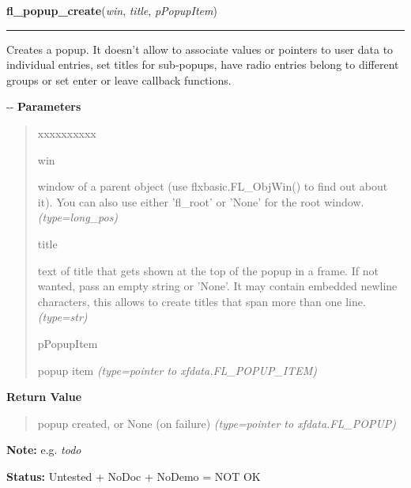     \label{xformslib:flpopup:fl_popup_create}

    \vspace{0.5ex}

\hspace{.8\funcindent}\begin{boxedminipage}{\funcwidth}

    \raggedright \textbf{fl\_popup\_create}(\textit{win}, \textit{title}, \textit{pPopupItem})

    \vspace{-1.5ex}

    \rule{\textwidth}{0.5\fboxrule}
\setlength{\parskip}{2ex}

Creates a popup. It doesn't allow to associate values or pointers to
user data to individual entries, set titles for sub-popups, have radio
entries belong to different groups or set enter or leave callback
functions.

-{}-
\setlength{\parskip}{1ex}
      \textbf{Parameters}
      \vspace{-1ex}

      \begin{quote}
        \begin{Ventry}{xxxxxxxxxx}

          \item[win]


window of a parent object (use flxbasic.FL\_ObjWin() to find out about
it). You can also use either 'fl\_root' or 'None' for the root window.
            {\it (type=long\_pos)}

          \item[title]


text of title that gets shown at the top of the popup in a frame. If
not wanted, pass an empty string or 'None'. It may contain embedded
newline characters, this allows to create titles that span more than
one line.
            {\it (type=str)}

          \item[pPopupItem]


popup item
            {\it (type=pointer to xfdata.FL\_POPUP\_ITEM)}

        \end{Ventry}

      \end{quote}

      \textbf{Return Value}
    \vspace{-1ex}

      \begin{quote}

popup created, or None (on failure)
      {\it (type=pointer to xfdata.FL\_POPUP)}

      \end{quote}

\textbf{Note:} 
e.g. \emph{todo}


\textbf{Status:} 
Untested + NoDoc + NoDemo = NOT OK


    \end{boxedminipage}

